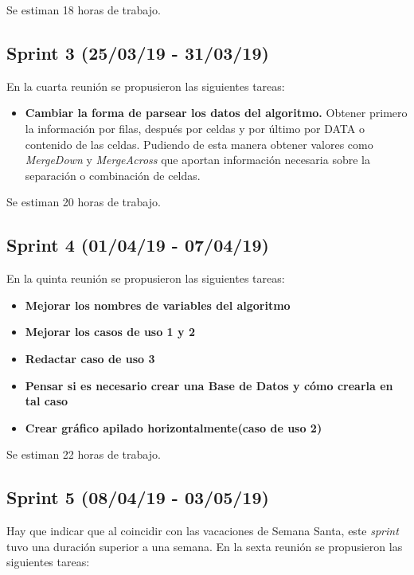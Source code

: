 Se estiman 18 horas de trabajo.

\subsection{Sprint 3 (25/03/19 - 31/03/19)}
En la cuarta reunión se propusieron las siguientes tareas:

\begin{itemize}
\item
\textbf{Cambiar la forma de parsear los datos del algoritmo.} Obtener primero la información por filas, después por celdas y por último por DATA o contenido de las celdas. Pudiendo de esta manera obtener valores como \emph{MergeDown} y \emph{MergeAcross} que aportan información necesaria sobre la separación o combinación de celdas.   
\end{itemize}

Se estiman 20 horas de trabajo.

\subsection{Sprint 4 (01/04/19 - 07/04/19)}
En la quinta reunión se propusieron las siguientes tareas:

\begin{itemize}
\item
\textbf{Mejorar los nombres de variables del algoritmo}
\item
\textbf{Mejorar los casos de uso 1 y 2}
\item
\textbf{Redactar caso de uso 3}
\item
\textbf{Pensar si es necesario crear una Base de Datos y cómo crearla en tal caso}
\item
\textbf{Crear gráfico apilado horizontalmente(caso de uso 2)}
\end{itemize}

Se estiman 22 horas de trabajo.

\subsection{Sprint 5 (08/04/19 - 03/05/19)}
Hay que indicar que al coincidir con las vacaciones de Semana Santa, este \emph{sprint} tuvo una duración superior a una semana. En la sexta reunión se propusieron las siguientes tareas:

